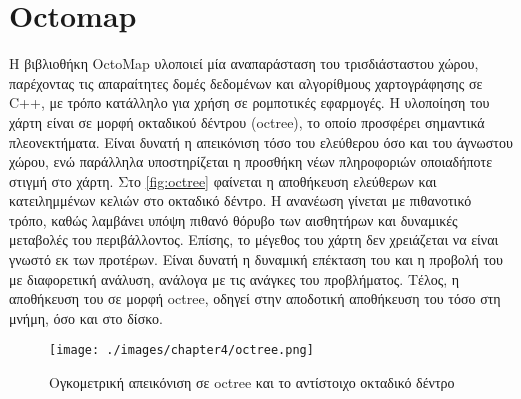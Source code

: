 \section{Octomap}
\label{section:octomap}

Η βιβλιοθήκη OctoMap \cite{hornung13auro} υλοποιεί μία αναπαράσταση του τρισδιάσταστου χώρου, παρέχοντας τις απαραίτητες δομές δεδομένων και αλγορίθμους χαρτογράφησης σε C++, με τρόπο κατάλληλο για χρήση σε  ρομποτικές εφαρμογές. Η υλοποίηση του χάρτη είναι σε μορφή οκταδικού δέντρου (octree), το οποίο προσφέρει σημαντικά πλεονεκτήματα. Είναι δυνατή η απεικόνιση τόσο του ελεύθερου όσο και του άγνωστου χώρου, ενώ παράλληλα υποστηρίζεται η προσθήκη νέων πληροφοριών οποιαδήποτε στιγμή στο χάρτη. Στο \autoref{fig:octree} φαίνεται η αποθήκευση ελεύθερων και κατειλημμένων κελιών στο οκταδικό δέντρο. Η ανανέωση γίνεται με πιθανοτικό τρόπο, καθώς λαμβάνει υπόψη πιθανό θόρυβο των αισθητήρων και δυναμικές μεταβολές του περιβάλλοντος. Επίσης, το μέγεθος του χάρτη δεν χρειάζεται να είναι γνωστό εκ των προτέρων. Είναι δυνατή η δυναμική επέκταση του και η προβολή του με διαφορετική ανάλυση, ανάλογα με τις ανάγκες του προβλήματος. Τέλος, η αποθήκευση του σε μορφή octree, οδηγεί στην αποδοτική αποθήκευση του τόσο στη μνήμη, όσο και στο δίσκο.

\begin{figure}[!ht]
    \centering
    \texttt{[image: ./images/chapter4/octree.png]}
    \caption{Ογκομετρική απεικόνιση σε octree και το αντίστοιχο οκταδικό δέντρο} 
    \label{fig:octree}
\end{figure}

